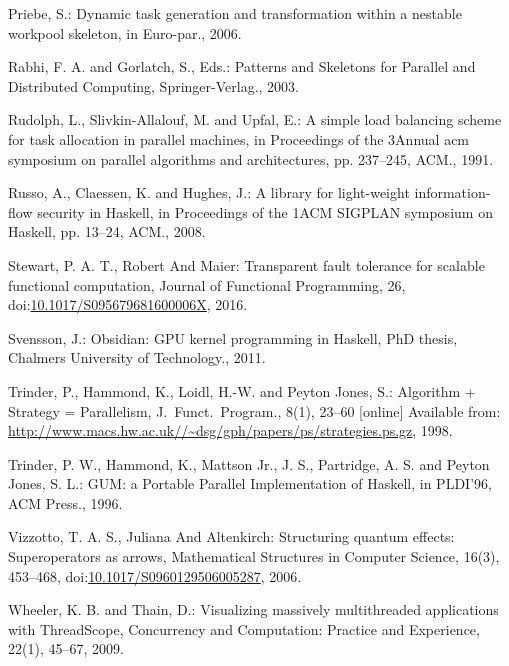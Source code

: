 \documentclass[paper=A4,twoside=true,openright,parskip=full,chapterprefix=true,headings=normal,bibliography=totoc,listof=totoc,titlepage=on,captions=tableabove,draft=false,british]{scrreprt}%
\begin{document}
\leavevmode\hypertarget{ref-WPEuropar06}{}%
Priebe, S.: Dynamic task generation and transformation within a nestable
workpool skeleton, in Euro-par., 2006.

\leavevmode\hypertarget{ref-SkeletonBook}{}%
Rabhi, F. A. and Gorlatch, S., Eds.: Patterns and Skeletons for Parallel
and Distributed Computing, Springer-Verlag., 2003.

\leavevmode\hypertarget{ref-Rudolph:1991:SLB:113379.113401}{}%
Rudolph, L., Slivkin-Allalouf, M. and Upfal, E.: A simple load balancing
scheme for task allocation in parallel machines, in Proceedings of the
3Annual acm symposium on parallel algorithms and architectures, pp.
237--245, ACM., 1991.

\leavevmode\hypertarget{ref-Russo:2008:LLI:1411286.1411289}{}%
Russo, A., Claessen, K. and Hughes, J.: A library for light-weight
information-flow security in Haskell, in Proceedings of the 1ACM SIGPLAN
symposium on Haskell, pp. 13--24, ACM., 2008.

\leavevmode\hypertarget{ref-stewart_maier_trinder_2016}{}%
Stewart, P. A. T., Robert And Maier: Transparent fault tolerance for
scalable functional computation, Journal of Functional Programming, 26,\linebreak
doi:\href{https://doi.org/10.1017/S095679681600006X}{10.1017/S095679681600006X},
2016.

\leavevmode\hypertarget{ref-obsidian-phd}{}%
Svensson, J.: Obsidian: GPU kernel programming in Haskell, PhD thesis,
Chalmers University of Technology., 2011.

\leavevmode\hypertarget{ref-Trinder1998a}{}%
Trinder, P., Hammond, K., Loidl, H.-W. and Peyton Jones, S.: Algorithm +
Strategy = Parallelism, J.~Funct.~Program., 8(1), 23--60 {[}online{]}
Available from:
\url{http://www.macs.hw.ac.uk//~dsg/gph/papers/ps/strategies.ps.gz},
1998.

\leavevmode\hypertarget{ref-Trinder1996}{}%
Trinder, P. W., Hammond, K., Mattson Jr., J. S., Partridge, A. S. and
Peyton Jones, S. L.: GUM: a Portable Parallel Implementation of Haskell,
in PLDI'96, ACM Press., 1996.

\leavevmode\hypertarget{ref-vizzotto_altenkirch_sabry_2006}{}%
Vizzotto, T. A. S., Juliana And Altenkirch: Structuring quantum effects:
Superoperators as arrows, Mathematical Structures in Computer Science,
16(3), 453--468,
doi:\href{https://doi.org/10.1017/S0960129506005287}{10.1017/S0960129506005287},
2006.

\leavevmode\hypertarget{ref-Wheeler2009}{}%
Wheeler, K. B. and Thain, D.: Visualizing massively multithreaded
applications with ThreadScope, Concurrency and Computation: Practice and
Experience, 22(1), 45--67, 2009.
\end{document}
